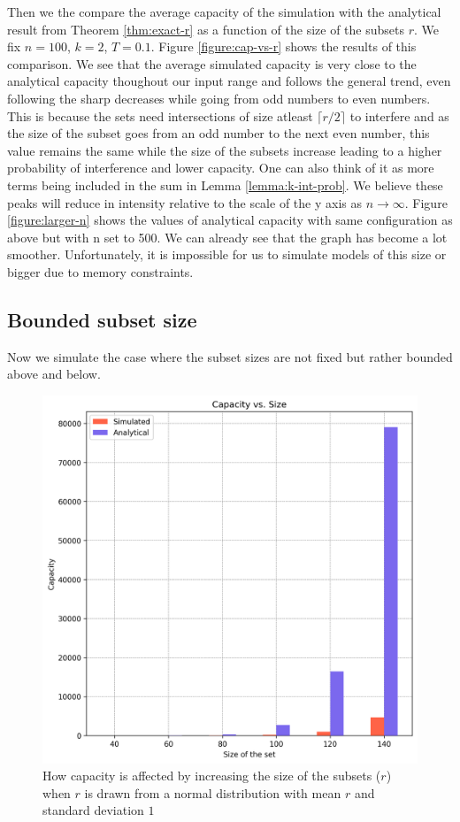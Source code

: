 Then we the compare the average capacity of the simulation with the analytical result from Theorem \ref{thm:exact-r} as a function of the size of the subsets $r$. We fix $n=100$, $k=2$, $T=0.1$. Figure \ref{figure:cap-vs-r} shows the results of this comparison. We see that the average simulated capacity is very close to the analytical capacity thoughout our input range and follows the general trend, even following the sharp decreases while going from odd numbers to even numbers. This is because the sets need intersections of size atleast $\lceil r/2 \rceil$ to interfere and as the size of the subset goes from an odd number to the next even number, this value remains the same while the size of the subsets increase leading to a higher probability of interference and lower capacity. One can also think of it as more terms being included in the sum in Lemma \ref{lemma:k-int-prob}. We believe these peaks will reduce in intensity relative to the scale of the y axis as $n \to \infty$. Figure \ref{figure:larger-n} shows the values of analytical capacity with same configuration as above but with n set to 500. We can already see that the graph has become a lot smoother. Unfortunately, it is impossible for us to simulate models of this size or bigger due to memory constraints. 

\subsection{Bounded subset size}
Now we simulate the case where the subset sizes are not fixed but rather bounded above and below. 

\begin{figure}%
    \centering
    \includegraphics[scale=0.82]{figures/cap-vs-n-bounded.png}
    \caption[Capacity vs. Size of the set ($n$) when $r \sim \mathcal{N}(r,1)$ ]{How capacity is affected by increasing the size of the subsets ($r$) when $r$ is drawn from a normal distribution with mean $r$ and standard deviation $1$}
    \label{figure:cap-vs-n-bounded}
    \end{figure}

